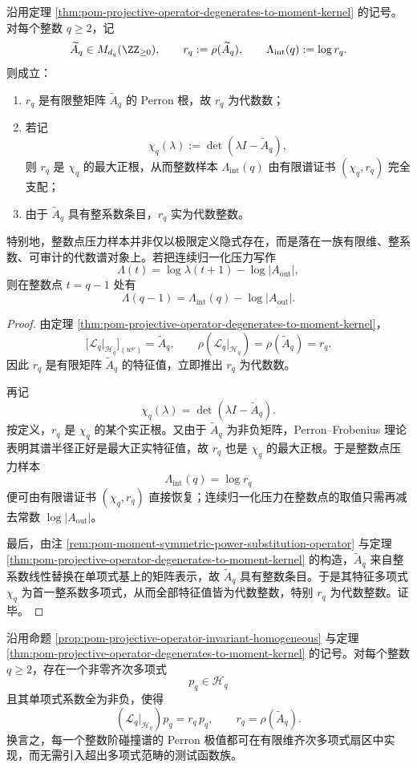 \begin{theorem}[整数阶压力样本由有限谱证书支配并且皆为代数整数的对数]\label{thm:xi-projective-pressure-integer-spectral-certificate}
沿用定理 \ref{thm:pom-projective-operator-degenerates-to-moment-kernel} 的记号。对每个整数 \(q\ge 2\)，记
\[
\widetilde A_q\in M_{d_q}(\ZZ_{\ge 0}),
\qquad
r_q:=\rho(\widetilde A_q),
\qquad
\Lambda_{\mathrm{int}}(q):=\log r_q.
\]
则成立：
\begin{enumerate}
  \item \(r_q\) 是有限整矩阵 \(\widetilde A_q\) 的 Perron 根，故 \(r_q\) 为代数数；
  \item 若记
  \[
  \chi_q(\lambda):=\det(\lambda I-\widetilde A_q),
  \]
  则 \(r_q\) 是 \(\chi_q\) 的最大正根，从而整数样本 \(\Lambda_{\mathrm{int}}(q)\) 由有限谱证书 \((\chi_q,r_q)\) 完全支配；
  \item 由于 \(\widetilde A_q\) 具有整系数条目，\(r_q\) 实为代数整数。
\end{enumerate}
特别地，整数点压力样本并非仅以极限定义隐式存在，而是落在一族有限维、整系数、可审计的代数谱对象上。若把连续归一化压力写作
\[
\Lambda(t)=\log\lambda(t+1)-\log|A_{\mathrm{out}}|,
\]
则在整数点 \(t=q-1\) 处有
\[
\Lambda(q-1)=\Lambda_{\mathrm{int}}(q)-\log|A_{\mathrm{out}}|.
\]
\end{theorem}
\begin{proof}
由定理 \ref{thm:pom-projective-operator-degenerates-to-moment-kernel}，
\[
\bigl[\mathcal L_q|_{\mathcal H_q}\bigr]_{(w^\nu)}=\widetilde A_q,
\qquad
\rho(\mathcal L_q|_{\mathcal H_q})=\rho(\widetilde A_q)=r_q.
\]
因此 \(r_q\) 是有限矩阵 \(\widetilde A_q\) 的特征值，立即推出 \(r_q\) 为代数数。

再记
\[
\chi_q(\lambda)=\det(\lambda I-\widetilde A_q).
\]
按定义，\(r_q\) 是 \(\chi_q\) 的某个实正根。又由于 \(\widetilde A_q\) 为非负矩阵，Perron--Frobenius 理论表明其谱半径正好是最大正实特征值，故 \(r_q\) 也是 \(\chi_q\) 的最大正根。于是整数点压力样本
\[
\Lambda_{\mathrm{int}}(q)=\log r_q
\]
便可由有限谱证书 \((\chi_q,r_q)\) 直接恢复；连续归一化压力在整数点的取值只需再减去常数 \(\log|A_{\mathrm{out}}|\)。

最后，由注 \ref{rem:pom-moment-symmetric-power-substitution-operator} 与定理 \ref{thm:pom-projective-operator-degenerates-to-moment-kernel} 的构造，\(\widetilde A_q\) 来自整系数线性替换在单项式基上的矩阵表示，故 \(\widetilde A_q\) 具有整数条目。于是其特征多项式 \(\chi_q\) 为首一整系数多项式，从而全部特征值皆为代数整数，特别 \(r_q\) 为代数整数。证毕。
\end{proof}
\begin{theorem}\label{thm:xi-projective-moment-homogeneous-polynomial-perron-extremizer}
沿用命题 \ref{prop:pom-projective-operator-invariant-homogeneous} 与定理 \ref{thm:pom-projective-operator-degenerates-to-moment-kernel} 的记号。对每个整数 \(q\ge 2\)，存在一个非零齐次多项式
\[
p_q\in \mathcal H_q
\]
且其单项式系数全为非负，使得
\[
(\mathcal L_q|_{\mathcal H_q})p_q=r_q\,p_q,
\qquad
r_q=\rho(\widetilde A_q).
\]
换言之，每一个整数阶碰撞谱的 Perron 极值都可在有限维齐次多项式扇区中实现，而无需引入超出多项式范畴的测试函数族。
\end{theorem}
